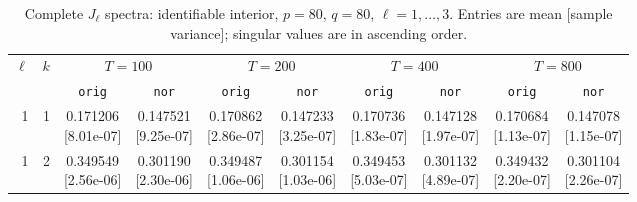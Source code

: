\documentclass[12pt,letterpaper]{article}
\def\spacingset#1{\renewcommand{\baselinestretch}{#1}\small\normalsize}
\theoremstyle{plain}
\theoremstyle{definition}
\begin{document}
\begin{table}[p]
\begingroup
\spacingset{1.0}
\small\centering
\caption{Complete $J_\ell$ spectra: identifiable interior, $p=80$, $q=80$, $\ell=1,\ldots,3$. Entries are mean [sample variance]; singular values are in ascending order.}
\label{s23:lambda:alltab:spectra:p80q80interior:1-3}
\footnotesize
\setlength{\tabcolsep}{2.2pt}
\renewcommand{\arraystretch}{1.03}
\begin{adjustbox}{max width=\linewidth}
\begin{tabular}{@{}rr*{8}{c}@{}}
\toprule
$\ell$ & $k$ & \multicolumn{2}{c}{$T=100$} & \multicolumn{2}{c}{$T=200$} & \multicolumn{2}{c}{$T=400$} & \multicolumn{2}{c}{$T=800$}\\
\cmidrule(lr){3-4}\cmidrule(lr){5-6}\cmidrule(lr){7-8}\cmidrule(lr){9-10}
 &  & \texttt{orig} & \texttt{nor} & \texttt{orig} & \texttt{nor} & \texttt{orig} & \texttt{nor} & \texttt{orig} & \texttt{nor}\\
\midrule
1 & 1 & \shortstack{0.171206\\[-1pt]{\scriptsize[8.01e-07]}} & \shortstack{0.147521\\[-1pt]{\scriptsize[9.25e-07]}} & \shortstack{0.170862\\[-1pt]{\scriptsize[2.86e-07]}} & \shortstack{0.147233\\[-1pt]{\scriptsize[3.25e-07]}} & \shortstack{0.170736\\[-1pt]{\scriptsize[1.83e-07]}} & \shortstack{0.147128\\[-1pt]{\scriptsize[1.97e-07]}} & \shortstack{0.170684\\[-1pt]{\scriptsize[1.13e-07]}} & \shortstack{0.147078\\[-1pt]{\scriptsize[1.15e-07]}}\\
1 & 2 & \shortstack{0.349549\\[-1pt]{\scriptsize[2.56e-06]}} & \shortstack{0.301190\\[-1pt]{\scriptsize[2.30e-06]}} & \shortstack{0.349487\\[-1pt]{\scriptsize[1.06e-06]}} & \shortstack{0.301154\\[-1pt]{\scriptsize[1.03e-06]}} & \shortstack{0.349453\\[-1pt]{\scriptsize[5.03e-07]}} & \shortstack{0.301132\\[-1pt]{\scriptsize[4.89e-07]}} & \shortstack{0.349432\\[-1pt]{\scriptsize[2.20e-07]}} & \shortstack{0.301104\\[-1pt]{\scriptsize[2.26e-07]}}\\

\end{tabular}
\end{adjustbox}
\end{table}
\end{document}

